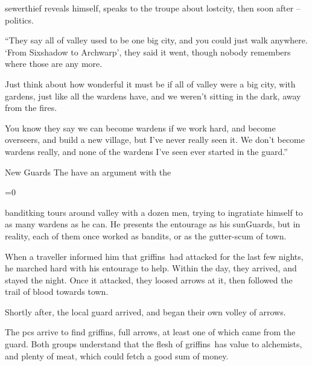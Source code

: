 \Gls{sewerthief} reveals himself, speaks to the troupe about \gls{lostcity}, then soon after -- politics.

\begin{speechtext}
  ``They say all of \gls{valley} used to be one big city, and you could just walk anywhere.
  `From Sixshadow to Archwarp', they said it went, though nobody remembers where those are any more.

  Just think about how wonderful it must be if all of \gls{valley} were a big city, with gardens, just like all the \glspl{warden} have, and we weren't sitting in the dark, away from the fires.

  You know they say we can become \glspl{warden} if we work hard, and become overseers, and build a new \gls{village}, but I've never really seen it.
  We don't become \glspl{warden} really, and none of the \glspl{warden} I've seen ever started in the \gls{guard}.''
\end{speechtext}


{New Guards}%
{The  have an argument with the }%

\ifnum\value{temperature}=0
  \newcommand\localMonster{griffins}
\else
  \newcommand\localMonster{a basilisk}
\fi

\begin{exampletext}
  \Gls{banditking} tours around \gls{valley} with a dozen men, trying to ingratiate himself to as many \glspl{warden} as he can.
  He presents the entourage as his \glspl{sunGuard}, but in reality, each of them once worked as bandits, or as the gutter-scum of \gls{town}.

  When a traveller informed him that \localMonster\ had attacked  for the last few nights, he marched hard with his entourage to help.
  Within the day, they arrived, and stayed the night.
  Once it attacked, they loosed arrows at it, then followed the trail of blood towards \gls{town}.

  Shortly after, the local \gls{guard} arrived, and began their own volley of arrows.
\end{exampletext}

The \glspl{pc} arrive to find \localMonster, full arrows, at least one of which came from the \gls{guard}.
Both groups understand that the flesh of \localMonster\ has value to alchemists, and plenty of meat, which could fetch a good sum of money.


